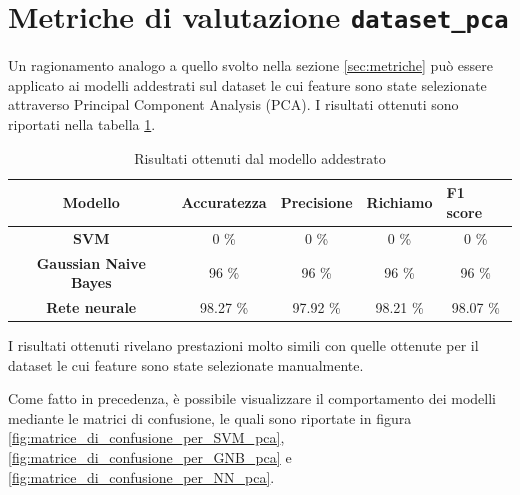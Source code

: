 
\section{Metriche di valutazione \texttt{dataset\_pca}} \label{sec:metriche_pca}
Un ragionamento analogo a quello svolto nella sezione \ref{sec:metriche} può essere
applicato ai modelli addestrati sul dataset le cui feature sono state selezionate
attraverso Principal Component Analysis (PCA). I risultati ottenuti sono riportati
nella tabella \ref{tab:risultati_pca}.

\begin{table}[!ht]
    \centering
    \begin{tabular}{@{}cllll@{}}
        \toprule
        \rowcolor[HTML]{EFEFEF}
        \textbf{Modello}                                      & \textbf{Accuratezza}         & \textbf{Precisione}          & \textbf{Richiamo}            & \textbf{F1 score}            \\ \midrule
        \cellcolor[HTML]{EFEFEF}\textbf{SVM}                  & \multicolumn{1}{c}{0 \%}     & \multicolumn{1}{c}{0 \%}     & \multicolumn{1}{c}{0 \%}     & \multicolumn{1}{c}{0 \%}     \\
        \cellcolor[HTML]{EFEFEF}\textbf{Gaussian Naive Bayes} & \multicolumn{1}{c}{96 \%}    & \multicolumn{1}{c}{96 \%}    & \multicolumn{1}{c}{96 \%}    & \multicolumn{1}{c}{96 \%}    \\
        \cellcolor[HTML]{EFEFEF}\textbf{Rete neurale}         & \multicolumn{1}{c}{98.27 \%} & \multicolumn{1}{c}{97.92 \%} & \multicolumn{1}{c}{98.21 \%} & \multicolumn{1}{c}{98.07 \%} \\ \bottomrule
    \end{tabular}
    \caption{Risultati ottenuti dal modello addestrato}
    \label{tab:risultati_pca}
\end{table}

I risultati ottenuti rivelano prestazioni molto simili con quelle ottenute per il
dataset le cui feature sono state selezionate manualmente.

Come fatto in precedenza, è possibile visualizzare il comportamento dei modelli
mediante le matrici di confusione, le quali sono riportate in figura \ref{fig:matrice_di_confusione_per_SVM_pca},
\ref{fig:matrice_di_confusione_per_GNB_pca} e \ref{fig:matrice_di_confusione_per_NN_pca}.

